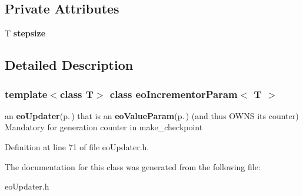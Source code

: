 \subsection*{Private Attributes}
\begin{CompactItemize}
\item 
T {\bf stepsize}\label{classeo_incrementor_param_r0}

\end{CompactItemize}


\subsection{Detailed Description}
\subsubsection*{template$<$class T$>$ class eo\-Incrementor\-Param$<$ T $>$}

an {\bf eo\-Updater}{\rm (p.\,\pageref{classeo_updater})} that is an {\bf eo\-Value\-Param}{\rm (p.\,\pageref{classeo_value_param})} (and thus OWNS its counter) Mandatory for generation counter in make\_\-checkpoint 



Definition at line 71 of file eo\-Updater.h.

The documentation for this class was generated from the following file:\begin{CompactItemize}
\item 
eo\-Updater.h\end{CompactItemize}
